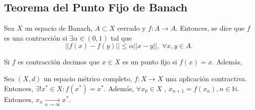 %
%
%

\subsection{Teorema del Punto Fijo de Banach}

\begin{defn}
  Sea $X$ un espacio de Banach, $A \subset X$ cerrado y $f: A \to A$. Entonces, se dice que $f$ es una contracción si $\exists \alpha \in (0,1)$ tal que
  \[ 
    ||f(x) - f(y)|| \leq \alpha ||x - y||, \; \forall x, y \in A.
  \] 
\end{defn}

\begin{obs}
  Si $f$ es contracción decimos que $x \in X$ es un punto fijo si $f(x) = x$. Además, 
\end{obs}

\begin{theo}
  Sea $(X, d)$ un espacio métrico completo, $f: X \to X$ una aplicación contractiva. Entonces, $\exists ! x^* \in X : f(x^*) = x^*$. Además, $\forall x_{0} \in X$ , $x_{n+1} = f(x_{n}), n \in \mathbb{N}$. Entonces, $x_{n} \xrightarrow[ n \rightarrow \infty ]{} x^*$.
\end{theo}

